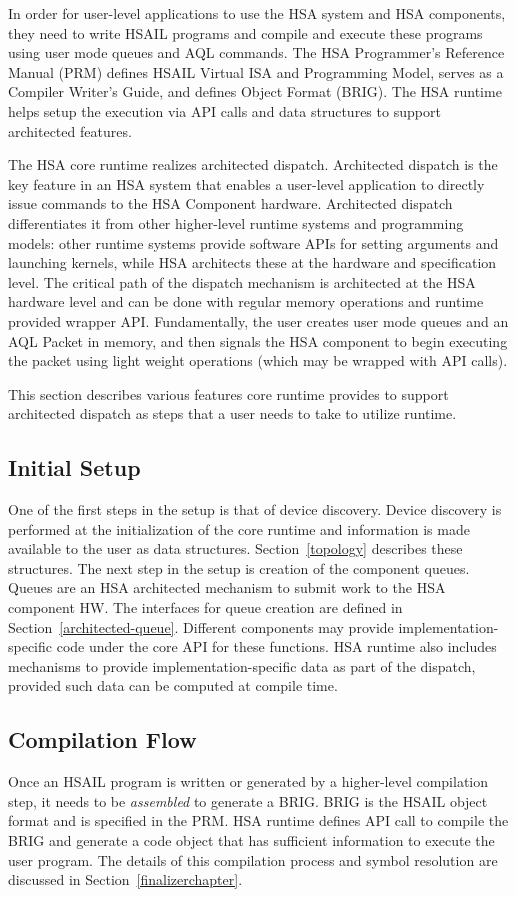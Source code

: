 \documentclass[draft]{book}
\begin{document}
In order for user-level applications to use the HSA system and HSA components,
they need to write HSAIL programs and compile and execute these programs using
user mode queues and AQL commands. The HSA Programmer's Reference Manual (PRM)
defines HSAIL Virtual ISA and Programming Model, serves as a Compiler Writer's
Guide, and defines Object Format (BRIG). The HSA runtime helps setup the
execution via API calls and data structures to support architected features.

The HSA core runtime realizes architected dispatch. Architected dispatch is the
key feature in an HSA system that enables a user-\/level application to directly
issue commands to the HSA Component hardware. Architected dispatch
differentiates it from other higher-\/level runtime systems and programming
models: other runtime systems provide software APIs for setting arguments and
launching kernels, while HSA architects these at the hardware and specification
level. The critical path of the dispatch mechanism is architected at the HSA
hardware level and can be done with regular memory operations and runtime
provided wrapper API. Fundamentally, the user creates user mode queues and an
AQL Packet in memory, and then signals the HSA component to begin executing the
packet using light weight operations (which may be wrapped with API calls).

This section describes various features core runtime provides to support
architected dispatch as steps that a user needs to take to utilize runtime.

\subsection{Initial Setup}
One of the first steps in the setup is that of device discovery. Device
discovery is performed at the initialization of the core runtime and information
is made available to the user as data structures. Section~\ref{topology}
describes these structures. The next step in the setup is creation of the
component queues. Queues are an HSA architected mechanism to submit work to the
HSA component HW. The interfaces for queue creation are defined in
Section~\ref{architected-queue}. Different components may provide
implementation-\/specific code under the core API for these functions. HSA
runtime also includes mechanisms to provide implementation-\/specific data as
part of the dispatch, provided such data can be computed at compile time.

\subsection{Compilation Flow}
Once an HSAIL program is written or generated by a higher-level compilation
step, it needs to be \emph{assembled} to generate a BRIG. BRIG is the HSAIL
object format and is specified in the PRM. HSA runtime defines API call to
compile the BRIG and generate a code object that has sufficient information to
execute the user program. The details of this compilation process and symbol
resolution are discussed in Section~\ref{finalizerchapter}.
\end{document}
